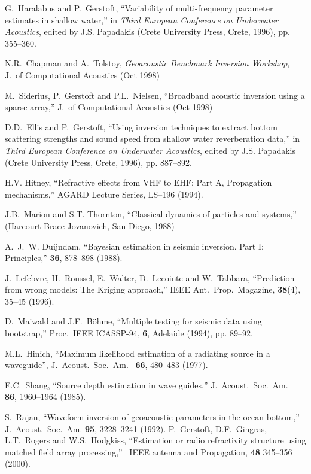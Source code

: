 \documentclass{saclantc}
\begin{document}
\begin{thebibliography}{11}
 G.~Haralabus and P.~Gerstoft, ``Variability
of multi-frequency parameter estimates in shallow water,'' in 
{\it Third European Conference on Underwater Acoustics}, 
edited by J.S. Papadakis (Crete University Press, Crete,
1996), pp. 355--360.

N.R.\ Chapman and A.\ Tolstoy, {\it Geoacoustic Benchmark Inversion Workshop},
 {J.\ of Computational
Acoustics} (Oct 1998)


M.\ Siderius, P.\ Gerstoft and P.L.~Nielsen, ``Broadband acoustic
inversion using a sparse array,'' {J.\ of Computational
Acoustics} (Oct 1998)

D.D.~Ellis and P.~Gerstoft, ``Using inversion techniques to
extract bottom scattering strengths and sound speed from shallow water
reverberation data,'' in
{\it Third European Conference on Underwater Acoustics}, 
edited by J.S. Papadakis (Crete University Press, Crete,
1996), pp. 887--892.

H.V. Hitney, ``Refractive effects from VHF to EHF: Part A, Propagation
mechanisms,''   AGARD Lecture Series, LS--196 (1994).

J.B.~Marion and S.T. Thornton, ``Classical dynamics of particles and systems,''
(Harcourt Brace Jovanovich, San Diego, 1988)


A.~J.~W. Duijndam,
\newblock ``Bayesian estimation in seismic inversion. Part I: Principles,''
 {\bf 36}, 878--898 (1988).


 J.\ Lefebvre,  H.~Roussel,  E.\ Walter, 
 D.\ Lecointe and  W.\ Tabbara,  ``Prediction from wrong models: 
The Kriging approach,''  {IEEE Ant.\ Prop.\ Magazine}, {\bf 38}(4), 
35--45 (1996).

D.~Maiwald and J.F.~B\"ohme,
``Multiple testing for seismic data using bootstrap,''
      Proc.~IEEE ICASSP-94, {\bf 6}, Adelaide (1994), pp. 89--92.

M.L.\ Hinich, ``Maximum likelihood estimation of a radiating source in
a waveguide'', 
{J.~Acoust.~Soc.~Am.\ } {\bf 66}, 480--483 (1977).

E.C.\ Shang, ``Source depth estimation in wave guides,'' 
{J.~Acoust.~Soc.~Am.\ } {\bf 86}, 1960--1964 (1985).


S.~Rajan, ``Waveform inversion of geoacoustic parameters 
in the ocean bottom,'' { J.~Acoust.~Soc.~Am.} {\bf 95}, 3228--3241 (1992).
 P.~Gerstoft, D.F.\ Gingras, L.T.\ Rogers and W.S.\ Hodgkiss, ``Estimation or radio
refractivity structure using matched field array processing,''  
{\ IEEE antenna and
Propagation},   {\bf 48} 345--356 (2000).


\end{thebibliography}
\end{document}
